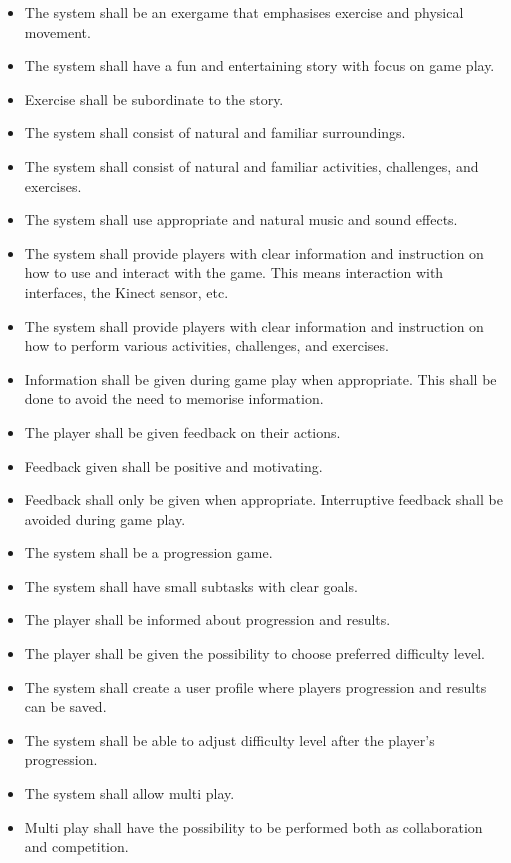 \begin{itemize}
\renewcommand{\labelitemi}{$\bullet$}
\item The system shall be an exergame that emphasises exercise and physical movement.
\item The system shall have a fun and entertaining story with focus on game play. 
\item Exercise shall be subordinate to the story.
\item The system shall consist of natural and familiar surroundings.
\item The system shall consist of natural and familiar activities, challenges, and exercises.
\item The system shall use appropriate and natural music and sound effects. 
\item The system shall provide players with clear information and instruction on how to use and interact with the game. This means interaction with interfaces, the Kinect sensor, etc. 
\item The system shall provide players with clear information and instruction on how to perform various activities, challenges, and exercises. 
\item Information shall be given during game play when appropriate. This shall be done to avoid the need to memorise information. 
\item The player shall be given feedback on their actions. 
\item Feedback given shall be positive and motivating.
\item Feedback shall only be given when appropriate. Interruptive feedback shall be avoided during game play. 
\item The system shall be a progression game.
\item The system shall have small subtasks with clear goals. 
\item The player shall be informed about progression and results.
\item The player shall be given the possibility to choose preferred difficulty level.
\item The system shall create a user profile where players progression and results can be saved.
\item The system shall be able to adjust difficulty level after the player's progression.
\item The system shall allow multi play.
\item Multi play shall have the possibility to be performed both as collaboration and competition.

\end{itemize}

